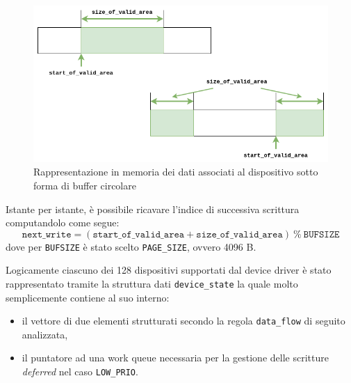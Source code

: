\documentclass{article}
\begin{document}
\begin{figure}[htbp]
        \centering
        \includegraphics[width=.8\textwidth]{buffer}
        \caption{Rappresentazione in memoria dei dati associati al dispositivo sotto forma di buffer circolare}
        \label{fig:buffer}
\end{figure}

Istante per istante, è possibile ricavare l'indice di successiva scrittura computandolo come segue:
\[
        \mathtt{next\_write} = (\mathtt{start\_of\_valid\_area} + \mathtt{size\_of\_valid\_area})\ \%\ \mathtt{BUFSIZE}
\]
dove per \texttt{BUFSIZE} è stato scelto \texttt{PAGE\_SIZE}, ovvero 4096 B.

Logicamente ciascuno dei 128 dispositivi supportati dal device driver è stato rappresentato tramite la struttura dati \texttt{device\_state} la quale molto semplicemente contiene al suo interno:
\begin{itemize}
        \item il vettore di due elementi strutturati secondo la regola \texttt{data\_flow} di seguito analizzata,
        \item il puntatore ad una work queue necessaria per la gestione delle scritture \textit{deferred} nel caso \texttt{LOW\_PRIO}.
\end{itemize}
\end{document}
